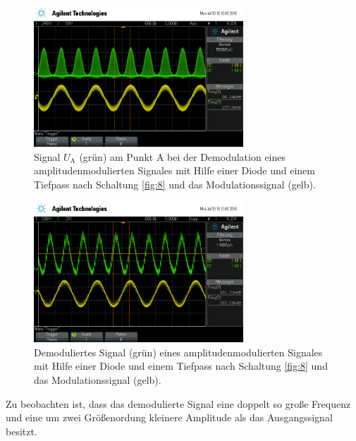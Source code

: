 \begin{figure}
  \centering
  \includegraphics[width=0.7\textwidth]{osci/amp_demod_diode_A.png}
  \caption{Signal $U_{\text{A}}$ (grün) am Punkt A bei der Demodulation eines amplitudenmodulierten Signales mit Hilfe einer
  Diode und einem Tiefpass nach Schaltung \ref{fig:8} und das Modulationssignal (gelb).}
  \label{fig:diode_punkt_A}
\end{figure}


\begin{figure}
  \centering
  \includegraphics[width=0.7\textwidth]{osci/amp_demod_diode.png}
  \caption{Demoduliertes Signal (grün) eines amplitudenmodulierten Signales mit Hilfe einer
  Diode und einem Tiefpass nach Schaltung \ref{fig:8} und das Modulationssignal (gelb).}
\label{fig:diode_demod_amp}
\end{figure}

Zu beobachten ist, dass das demodulierte Signal eine doppelt so große Frequenz
und eine um zwei Größenordung kleinere Amplitude als das Ausgangssignal
besitzt.
\FloatBarrier
